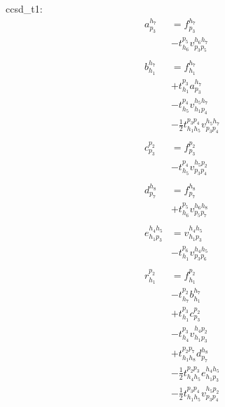 \documentclass{article}
\begin{document}
ccsd\_t1:
{\Large
\begin{align}
a ^{ h_{7} } _{ p_{3} } &= f ^{ h_{7} } _{ p_{3} }\tag{ccsd\_t1\_2\_2\_1}\\
                        &- t ^{ p_{5} } _{ h_{6} } v ^{ h_{6} h_{7} } _{ p_{3} p_{5} }\tag{ccsd\_t1\_2\_2\_2}\\
\nonumber\\
b ^{ h_{7} } _{ h_{1} } &= f ^{ h_{7} } _{ h_{1} }\tag{ccsd\_t1\_2\_1}\\
                        &+ t ^{ p_{3} } _{ h_{1} } a ^{ h_{7} } _{ p_{3} }\tag{ccsd\_t1\_2\_2}\\
                        &- t ^{ p_{4} } _{ h_{5} } v ^{ h_{5} h_{7} } _{ h_{1} p_{4} }\tag{ccsd\_t1\_2\_3}\\
                        &- \frac{1}{2} t ^{ p_{3} p_{4} } _{ h_{1} h_{5} } v ^{ h_{5} h_{7} } _{ p_{3} p_{4} }\tag{ccsd\_t1\_2\_4}\\
\nonumber\\
c ^{ p_{2} } _{ p_{3} } &= f ^{ p_{2} } _{ p_{3} }\tag{ccsd\_t1\_3\_1}\\
                        &- t ^{ p_{4} } _{ h_{5} } v ^{ h_{5} p_{2} } _{ p_{3} p_{4} }\tag{ccsd\_t1\_3\_2}\\
\nonumber\\
d ^{ h_{8} } _{ p_{7} } &= f ^{ h_{8} } _{ p_{7} }\tag{ccsd\_t1\_5\_1}\\
                        &+ t ^{ p_{5} } _{ h_{6} } v ^{ h_{6} h_{8} } _{ p_{5} p_{7} }\tag{ccsd\_t1\_5\_2}\\
\nonumber\\
e ^{ h_{4} h_{5} } _{ h_{1} p_{3} } &= v ^{ h_{4} h_{5} } _{ h_{1} p_{3} }\tag{ccsd\_t1\_6\_1}\\
                                    &- t ^{ p_{6} } _{ h_{1} } v ^{ h_{4} h_{5} } _{ p_{3} p_{6} }\tag{ccsd\_t1\_6\_2}\\
\nonumber\\
r ^{ p_{2} } _{ h_{1} } &= f ^{ p_{2} } _{ h_{1} }\tag{ccsd\_t1\_1}\\
                        &- t ^{ p_{2} } _{ h_{7} } b ^{ h_{7} } _{ h_{1} }\tag{ccsd\_t1\_2}\\
                        &+ t ^{ p_{3} } _{ h_{1} } c ^{ p_{2} } _{ p_{3} }\tag{ccsd\_t1\_3}\\
                        &- t ^{ p_{3} } _{ h_{4} } v ^{ h_{4} p_{2} } _{ h_{1} p_{3} }\tag{ccsd\_t1\_4}\\
                        &+ t ^{ p_{2} p_{7} } _{ h_{1} h_{8} } d ^{ h_{8} } _{ p_{7} }\tag{ccsd\_t1\_5}\\
                        &- \frac{1}{2} t ^{ p_{2} p_{3} } _{ h_{4} h_{5} } e ^{ h_{4} h_{5} } _{ h_{1} p_{3} }\tag{ccsd\_t1\_6}\\
                        &- \frac{1}{2} t ^{ p_{3} p_{4} } _{ h_{1} h_{5} } v ^{ h_{5} p_{2} } _{ p_{3} p_{4} }\tag{ccsd\_t1\_7}
\end{align}
}
\end{document}
